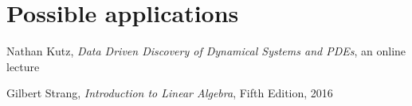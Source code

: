 \documentclass[10pt,twocolumn]{article}
\begin{document}
\section{Possible applications}












\thebibliography{}

 Nathan Kutz, \textit{Data Driven Discovery of Dynamical Systems and PDEs}, an online lecture 

 Gilbert Strang, \textit{Introduction to Linear Algebra}, Fifth Edition, 2016

 \label{bib:pope}
\end{document}
